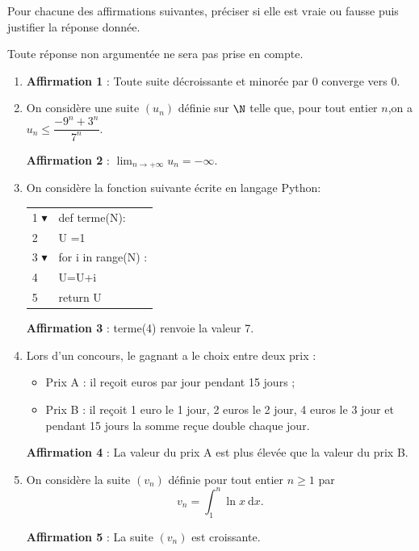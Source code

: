 \medskip

Pour chacune des affirmations suivantes, préciser si elle est vraie ou fausse puis justifier
la réponse donnée.

Toute réponse non argumentée ne sera pas prise en compte.

\medskip

\begin{enumerate}
\item \textbf{Affirmation 1 }: Toute suite décroissante et minorée par 0 converge vers 0.
\item On considère une suite $\left(u_n\right)$ définie sur $\N$ telle que, pour tout entier $n$,on a \linebreak $u_n \leqslant  \dfrac{-9^n + 3^n}{7^n}$.

\textbf{Affirmation 2} : $\displaystyle\lim_{n \to + \infty} u_n =- \infty$.

\item On considère la fonction suivante écrite en langage Python:
\begin{center}
\begin{tabular}{l l}
1 {\tiny $\blacktriangledown$}& def terme(N):\\
2&\qquad  U =1\\
3 {\tiny $\blacktriangledown$}&\qquad for i in range(N) :\\
4&\qquad \qquad  U=U+i\\
5&\qquad  return U\\
\end{tabular}
\end{center}


\textbf{Affirmation 3} : terme(4) renvoie la valeur 7.
\item Lors d'un concours, le gagnant a le choix entre deux prix :

\begin{itemize}
\item Prix A : il reçoit  euros par jour pendant 15 jours ;
\item Prix B : il reçoit 1 euro le 1 jour, 2 euros le 2 jour, 4 euros le 3 jour et pendant 15 jours la somme reçue double chaque jour.
\end{itemize}

\textbf{Affirmation 4 }: La valeur du prix A est plus élevée que la valeur du prix B.

\item On considère la suite $\left(v_n\right)$ définie pour tout entier $n \geqslant 1$ par
\[v_n = \displaystyle\int_1^n \ln x\:\text{d}x.\]

\textbf{Affirmation 5 }: La suite $\left(v_n\right)$ est croissante.
\end{enumerate}
